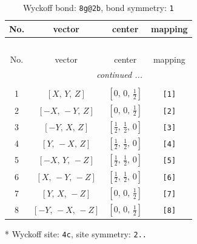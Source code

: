 \documentclass[fleqn,8pt]{jsarticle}
\begin{document}
\begin{longtable}{cccc}
\caption{Wyckoff bond: {\tt 8g@2b}, bond symmetry: {\tt 1}}
 \\
 \hline \hline
No. & vector & center & mapping \\ \hline \endfirsthead

\multicolumn{3}{l}{\tablename\ \thetable{}} \\
 \hline \hline
No. & vector & center & mapping \\ \hline \endhead

 \hline \hline
\multicolumn{3}{r}{\footnotesize\it continued ...} \\ \endfoot

 \hline \hline
\multicolumn{3}{r}{} \\ \endlastfoot

1 & $\left[ X,\, Y,\, Z \right]$ & $\left[ 0,\, 0,\, \frac{1}{2} \right]$ & {\tt [1]} \\ \hline
2 & $\left[ - X,\, - Y,\, Z \right]$ & $\left[ 0,\, 0,\, \frac{1}{2} \right]$ & {\tt [2]} \\ \hline
3 & $\left[ - Y,\, X,\, Z \right]$ & $\left[ \frac{1}{2},\, \frac{1}{2},\, 0 \right]$ & {\tt [3]} \\ \hline
4 & $\left[ Y,\, - X,\, Z \right]$ & $\left[ \frac{1}{2},\, \frac{1}{2},\, 0 \right]$ & {\tt [4]} \\ \hline
5 & $\left[ - X,\, Y,\, - Z \right]$ & $\left[ \frac{1}{2},\, \frac{1}{2},\, 0 \right]$ & {\tt [5]} \\ \hline
6 & $\left[ X,\, - Y,\, - Z \right]$ & $\left[ \frac{1}{2},\, \frac{1}{2},\, 0 \right]$ & {\tt [6]} \\ \hline
7 & $\left[ Y,\, X,\, - Z \right]$ & $\left[ 0,\, 0,\, \frac{1}{2} \right]$ & {\tt [7]} \\ \hline
8 & $\left[ - Y,\, - X,\, - Z \right]$ & $\left[ 0,\, 0,\, \frac{1}{2} \right]$ & {\tt [8]} \\
\end{longtable}
* Wyckoff site: {\tt 4c}, site symmetry: {\tt 2..}
\renewcommand{\arraystretch}{1.2}
\end{document}
